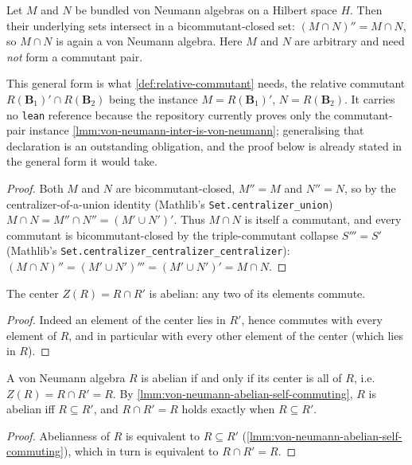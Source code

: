 \begin{lemma}
    \label{lmm:von-neumann-inter-general}
    Let $M$ and $N$ be bundled von Neumann algebras on a Hilbert space $H$. Then their underlying sets intersect in a bicommutant-closed set: $(M \cap N)'' = M \cap N$, so $M \cap N$ is again a von Neumann algebra. Here $M$ and $N$ are arbitrary and need \emph{not} form a commutant pair.

    This general form is what \ref{def:relative-commutant} needs, the relative commutant $R(\mathbf{B}_1)' \cap R(\mathbf{B}_2)$ being the instance $M = R(\mathbf{B}_1)'$, $N = R(\mathbf{B}_2)$. It carries no \texttt{lean} reference because the repository currently proves only the commutant-pair instance \ref{lmm:von-neumann-inter-is-von-neumann}; generalising that declaration is an outstanding obligation, and the proof below is already stated in the general form it would take.
\end{lemma}
\begin{proof}
    Both $M$ and $N$ are bicommutant-closed, $M'' = M$ and $N'' = N$, so by the centralizer-of-a-union identity (Mathlib's \texttt{Set.centralizer\_union}) $M \cap N = M'' \cap N'' = (M' \cup N')'$. Thus $M \cap N$ is itself a commutant, and every commutant is bicommutant-closed by the triple-commutant collapse $S''' = S'$ (Mathlib's \texttt{Set.centralizer\_centralizer\_centralizer}): $(M \cap N)'' = (M' \cup N')''' = (M' \cup N')' = M \cap N$.
\end{proof}

\begin{theorem}
    \label{thrm:von-neumann-center-abelian}
    \leanok
    The center $Z(R) = R \cap R'$ is abelian: any two of its elements commute.
\end{theorem}
\begin{proof}
    \leanok
    Indeed an element of the center lies in $R'$, hence commutes with every element of $R$, and in particular with every other element of the center (which lies in $R$).
\end{proof}

\begin{lemma}
    \label{lmm:von-neumann-center-eq-self-iff-abelian}
    \leanok
    A von Neumann algebra $R$ is abelian if and only if its center is all of $R$, i.e. $Z(R) = R \cap R' = R$. By \ref{lmm:von-neumann-abelian-self-commuting}, $R$ is abelian iff $R \subseteq R'$, and $R \cap R' = R$ holds exactly when $R \subseteq R'$.
\end{lemma}
\begin{proof}
    \leanok
    Abelianness of $R$ is equivalent to $R \subseteq R'$ (\ref{lmm:von-neumann-abelian-self-commuting}), which in turn is equivalent to $R \cap R' = R$.
\end{proof}

